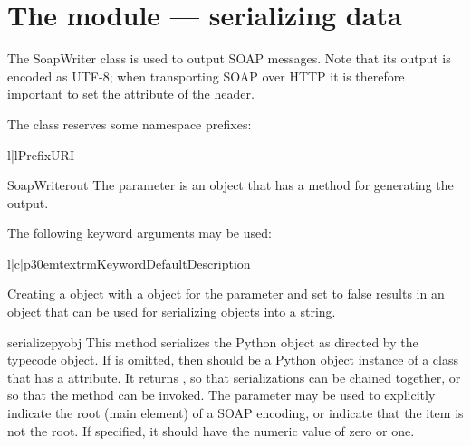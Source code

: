 \chapter{The  module --- serializing data}

The SoapWriter class is used to output SOAP messages.
Note that its output is encoded as UTF-8; when transporting SOAP over
HTTP it is therefore important to set the  attribute
of the  header.

The  class reserves some namespace prefixes:
\begin{tableii}{l|l}{}{Prefix}{URI}
\end{tableii}

\begin{classdesc}{SoapWriter}{out}
The  parameter is an object that has a 
method for generating the output.

The following keyword arguments may be used:

\begin{tableiii}{l|c|p{30em}}{textrm}{Keyword}{Default}{Description}
\end{tableiii}
\end{classdesc}

Creating a  object with a  object for
the  parameter and  set to false results in an
object that can be used for serializing objects into a string.

\begin{methoddesc}{serialize}{pyobj}
This method serializes the  Python object as directed
by the  typecode object.
If  is omitted, then  should be a Python
object instance of a class that has a  attribute.
It returns , so that serializations can be chained together, or
so that the  method can be invoked.
The  parameter may be used to explicitly indicate the root
(main element) of a SOAP encoding, or indicate that the item is not the
root.
If specified, it should have the numeric value of zero or one.
\end{methoddesc}

